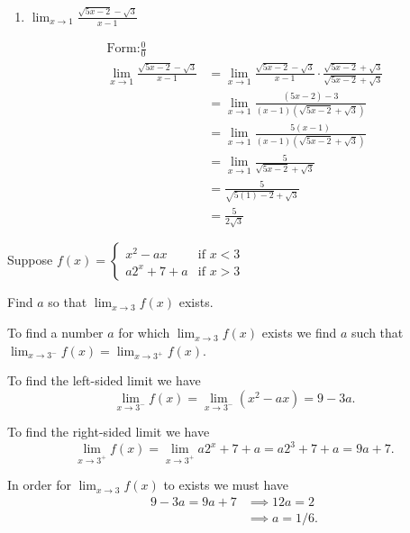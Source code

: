 \documentclass[nooutcomes]{ximera}
\begin{document}
\begin{problem}
\begin{enumerate}
	
	\item  $ \lim_{x \to 1} \frac{\sqrt{5x-2} - \sqrt{3}}{x-1} $
	\begin{freeResponse}
	\begin{align*}
	\text{Form:} \frac{0}{0}\\
	\lim_{x \to 1} \frac{\sqrt{5x-2} - \sqrt{3}}{x-1} &= \lim_{x \to 1} \frac{\sqrt{5x-2} - \sqrt{3}}{x-1} \cdot \frac{\sqrt{5x-2} + \sqrt{3}}{\sqrt{5x-2} + \sqrt{3}} \\
	&= \lim_{x \to 1} \frac{(5x-2)-3}{(x-1)(\sqrt{5x-2} + \sqrt{3})} \\
	&= \lim_{x \to 1} \frac{5(x-1)}{(x-1)(\sqrt{5x-2} + \sqrt{3})} \\
	&= \lim_{x \to 1} \frac{5}{\sqrt{5x-2} + \sqrt{3}} \\
	&=   \frac{5}{\sqrt{5(1)-2} + \sqrt{3}} \\
	&= \frac{5}{2 \sqrt{3}} 
	\end{align*}
	\end{freeResponse}
	\end{enumerate}
\end{problem}
	
	
	
	
			
			

\begin{problem}
Suppose
	$f(x) =   \left\{ \begin{array}{lr}
	x^2 - ax 	&	\text{if } x < 3	\\
	a2^x + 7 + a	&	\text{if } x > 3	\end{array} \right.  $
	
	Find $a$ so that $ \lim_{x \to 3} f(x)  $ exists.
	\begin{freeResponse}
	 To find a number $a$ for which $\lim_{x \to 3} f(x)$ exists we find $a$ such that $\lim_{x \to 3^-} f(x) = \lim_{x \to 3^+} f(x)$.

    To find the left-sided limit we have
    \[
      \lim_{x \to 3^-} f(x) = \lim_{x \to 3^-} (x^2 - ax) = 9 - 3a.
    \]
  
    To find the right-sided limit we have
    \[
      \lim_{x \to 3^+} f(x) = \lim_{x \to 3^+} a2^x + 7 + a = a2^3 + 7 + a = 9a + 7.
    \]

    In order for $\lim_{x \to 3} f(x)$ to exists we must have
    \begin{align*}
      9 - 3a = 9a + 7 &\implies 12a = 2\\
                      &\implies a = 1/6.
    \end{align*}
	\end{freeResponse}
\end{problem}
	
\end{document}
